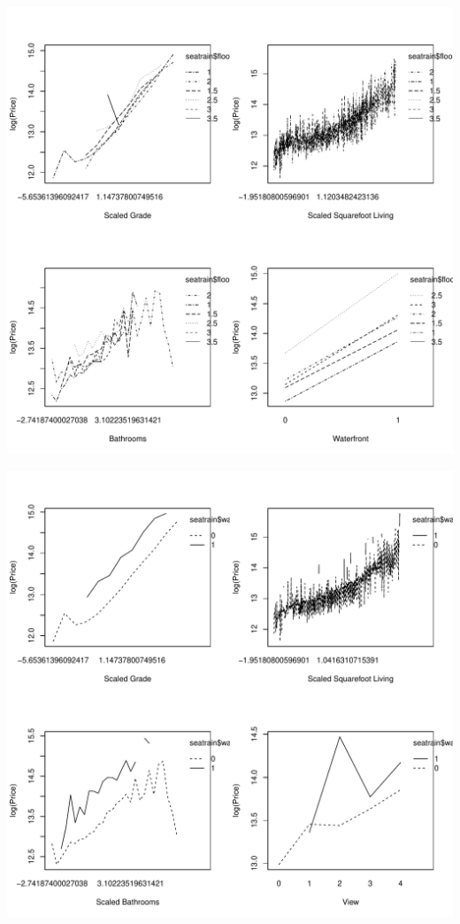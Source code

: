 \documentclass{article}\usepackage[]{graphicx}\usepackage[]{color}
\makeatletter
\def\maxwidth{ %
  \ifdim\Gin@nat@width>\linewidth
    \linewidth
  \else
    \Gin@nat@width
  \fi
}
\newenvironment{knitrout}{}{} %
\makeatother
\begin{document}
\begin{enumerate}
\begin{enumerate}
\begin{knitrout}
\color{fgcolor}
\includegraphics[width=\maxwidth]{figure/interact-1} 

\includegraphics[width=\maxwidth]{figure/interact-2} 


\end{knitrout}
\end{enumerate}
\end{enumerate}
\end{document}
